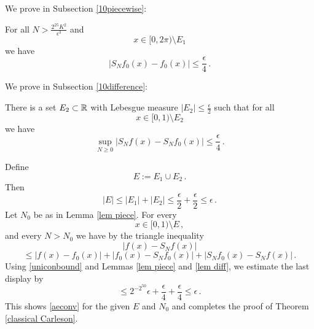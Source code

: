 {We prove in Subsection \ref{10piecewise}:
\begin{lemma}
\label{lem piece}
    For all $N>\frac {2^{25} K^2}{\epsilon ^3}$ and
    \begin{equation}
        x\in [0,2\pi)\setminus E_1
    \end{equation}
we have
    \begin{equation}
        |S_N f_0 (x)- f_0(x)|\le \frac \epsilon 4\, .
    \end{equation}
\end{lemma}


We prove in Subsection \ref{10difference}: 
\begin{lemma}\label{lem diff}
    There is a set $E_2 \subset \mathbb{R}$ with Lebesgue measure
    $|E_2|\le \frac \epsilon 2$ such that for all
    \begin{equation}
        x\in [0,1)\setminus E_2
    \end{equation}
   we have
    \begin{equation}
        \sup_{N\ge 0} |S_Nf(x)-S_Nf_0(x)|
        \le \frac \epsilon 4\,.
    \end{equation}
\end{lemma}

Define
\begin{equation}
    E:=E_1\cup E_2\, .
\end{equation}
Then
\begin{equation}
    |E|\le |E_1|+|E_2|\le \frac \epsilon 2 +\frac \epsilon 2 \le \epsilon\, .
\end{equation}
Let $N_0$ be as in Lemma \ref{lem piece}.
For every
\begin{equation}
x\in [0,1)\setminus E\, ,
\end{equation}
and every $N>N_0$ we have by the triangle inequality
\begin{equation}
    |f(x)-S_Nf(x)|
    \end{equation}
    \begin{equation}
    \le |f(x)-f_0(x)|+ |f_0(x)-S_Nf_0(x)|+|S_Nf_0(x)-S_N f(x)|\, .
\end{equation}
Using \eqref{uniconbound} and Lemmas \ref{lem piece}
and \ref{lem diff}, we estimate the last display by
\begin{equation}
    \le 2^{-2^{50}} \epsilon +\frac \epsilon 4 +\frac \epsilon 4\le \epsilon\, .
\end{equation}
This shows  \eqref{aeconv} for the given $E$ and $N_0$
and completes the proof of Theorem \ref{classical Carleson}.

}
